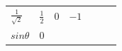 {{\begin{center}
\begin{xtabular}[t]{|l|l|l|l|l|l|l|}
    
        
                \begin{math}\frac{1}{\sqrt{2}}\end{math}
               &
    
    
        
                \begin{math}\frac{1}{2}\end{math}
               &
    
    
        0 &
    
    
        
                \begin{math}-1\end{math}
     \tabularnewline{}
    
    
        
                \begin{math}sin\theta \end{math}
               &
    
    
        0 &
    

\end{xtabular}
\end{center}}}
